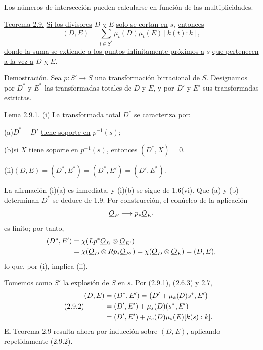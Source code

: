 Los números de intersección pueden calcularse en función de las multiplicidades.

\medskip
\noindent\underline{Teorema 2.9.}
\underline{Si los divisores} $D$ \underline{y} $E$ \underline{solo se cortan
en} $s$, \underline{entonces}
\begin{equation*}
(D,E)=\sum_{t\in S^*}\mu_t(D)\mu_t(E)[k(t):k],
\end{equation*}
\underline{donde la suma se extiende a los puntos infinitamente próximos a}
$s$ \underline{que pertenecen a la vez a} $D$ \underline{y} $E$.

\medskip
\noindent\underline{Demostración.}
Sea $p:S'\longrightarrow S$ una transformación birracional de $S$. Designamos
por $D^*$ y $E^*$ las transformadas totales de $D$ y $E$, y por $D'$ y $E'$ sus
transformadas estrictas.

\pageoriginale

\medskip
\noindent\underline{Lema 2.9.1.}
(i) \underline{La transformada total} $D^*$ \underline{se caracteriza por}:

\medskip
\noindent (a)\quad $D^*-D'$ \underline{tiene soporte en} $p^{-1}(s)$;

\noindent (b)\quad \underline{si} $X$ \underline{tiene soporte en}
$p^{-1}(s)$, \underline{entonces} $(D^*,X)=0$.

\noindent (ii)\quad $(D,E)=(D^*,E^*)=(D^*,E')=(D',E^*)$.

La afirmación (i)(a) es inmediata, y (i)(b) se sigue de 1.6(vi). Que (a) y (b)
determinan $D^*$ se deduce de 1.9. Por construcción, el conúcleo de la
aplicación
\begin{equation*}
\underline{O}_E\longrightarrow
\sisi{f_*\underline{O}_E}{p_*\underline{O}_{E'}}
\end{equation*}
es finito; por tanto,
\begin{equation*}
\begin{aligned}
(D^*,E')
&=\chi(L\sisi{f}{p}^*\underline{O}_D\otimes\underline{O}_{E'})\\
&=\chi(\underline{O}_D\otimes R\sisi{f}{p}_*\underline{O}_{E'})
=\chi(\underline{O}_D\otimes\underline{O}_E)
=(D,E),
\end{aligned}
\end{equation*}
lo que, por (i), implica (ii).

Tomemos como $S'$ la explosión de $S$ en $s$. Por (2.9.1), (2.6.3) y 2.7,
\begin{equation}\tag{2.9.2}
\begin{aligned}
(D,E)
&=(D^*,E')
=\bigl(D'+\mu_s(\sisi{S}{D})s^*,E'\bigr)\\
&=(D',E')+\mu_s(D)(s^*,E')\\
&=(D',E')+\mu_s(D)\mu_s(E)[k(s):k].
\end{aligned}
\end{equation}
El Teorema 2.9 resulta ahora por inducción sobre $(D,E)$, aplicando
repetidamente (2.9.2).

